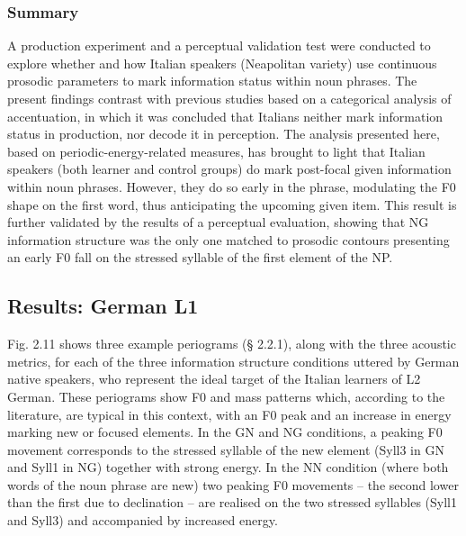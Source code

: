 \subsubsection{Summary}
\hypertarget{Toc191305905}{}\begin{styleStandard}
A production experiment and a perceptual validation test were conducted to explore whether and how Italian speakers (Neapolitan variety) use continuous prosodic parameters to mark information status within noun phrases. The present findings contrast with previous studies based on a categorical analysis of accentuation, in which it was concluded that Italians neither mark information status in production, nor decode it in perception. The analysis presented here, based on periodic-energy-related measures, has brought to light that Italian speakers (both learner and control groups) do mark post-focal given information within noun phrases. However, they do so early in the phrase, modulating the F0 shape on the first word, thus anticipating the upcoming given item. This result is further validated by the results of a perceptual evaluation, showing that NG information structure was the only one matched to prosodic contours presenting an early F0 fall on the stressed syllable of the first element of the NP.
\end{styleStandard}

\subsection{}
\subsection{Results: German L1}
\hypertarget{Toc191305906}{}\begin{styleStandard}
Fig. 2.11 shows three example periograms (§ 2.2.1), along with the three acoustic metrics, for each of the three information structure conditions uttered by German native speakers, who represent the ideal target of the Italian learners of L2 German. These periograms show F0 and mass patterns which, according to the literature, are typical in this context, with an F0 peak and an increase in energy marking new or focused elements. In the GN and NG conditions, a peaking F0 movement corresponds to the stressed syllable of the new element (Syll3 in GN and Syll1 in NG) together with strong energy. In the NN condition (where both words of the noun phrase are new) two peaking F0 movements – the second lower than the first due to declination – are realised on the two stressed syllables (Syll1 and Syll3) and accompanied by increased energy.
\end{styleStandard}

